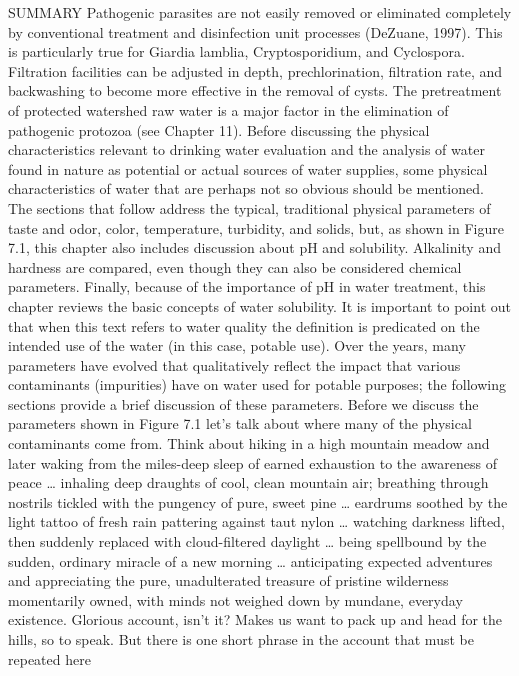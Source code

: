 \documentclass{article}
\begin{document}
SUMMARY Pathogenic parasites are not easily removed or eliminated
completely by conventional treatment and disinfection unit processes
(DeZuane, 1997). This is particularly true for Giardia lamblia,
Cryptosporidium, and Cyclospora. Filtration facilities can be adjusted
in depth, prechlorination, filtration rate, and backwashing to become
more effective in the removal of cysts. The pretreatment of protected
watershed raw water is a major factor in the elimination of pathogenic
protozoa (see Chapter 11). Before discussing the physical
characteristics relevant to drinking water evaluation and the analysis
of water found in nature as potential or actual sources of water
supplies, some physical characteristics of water that are perhaps not so
obvious should be mentioned. The sections that follow address the
typical, traditional physical parameters of taste and odor, color,
temperature, turbidity, and solids, but, as shown in Figure 7.1, this
chapter also includes discussion about pH and solubility. Alkalinity and
hardness are compared, even though they can also be considered chemical
parameters. Finally, because of the importance of pH in water treatment,
this chapter reviews the basic concepts of water solubility. It is
important to point out that when this text refers to water quality the
definition is predicated on the intended use of the water (in this case,
potable use). Over the years, many parameters have evolved that
qualitatively reflect the impact that various contaminants (impurities)
have on water used for potable purposes; the following sections provide
a brief discussion of these parameters. Before we discuss the parameters
shown in Figure 7.1 let's talk about where many of the physical
contaminants come from. Think about hiking in a high mountain meadow and
later waking from the miles-deep sleep of earned exhaustion to the
awareness of peace \ldots{} inhaling deep draughts of cool, clean
mountain air; breathing through nostrils tickled with the pungency of
pure, sweet pine \ldots{} eardrums soothed by the light tattoo of fresh
rain pattering against taut nylon \ldots{} watching darkness lifted,
then suddenly replaced with cloud-filtered daylight \ldots{} being
spellbound by the sudden, ordinary miracle of a new morning \ldots{}
anticipating expected adventures and appreciating the pure,
unadulterated treasure of pristine wilderness momentarily owned, with
minds not weighed down by mundane, everyday existence. Glorious account,
isn't it? Makes us want to pack up and head for the hills, so to speak.
But there is one short phrase in the account that must be repeated here
\end{document}
